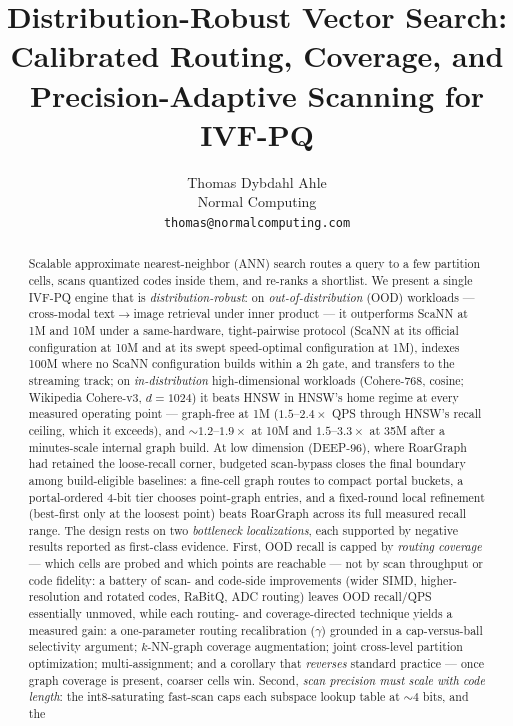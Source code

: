 \documentclass{article}
\title{Distribution-Robust Vector Search:\\
Calibrated Routing, Coverage, and Precision-Adaptive Scanning for IVF-PQ}
\author{Thomas Dybdahl Ahle\\Normal Computing\\\texttt{thomas@normalcomputing.com}}
\date{}
\begin{document}
\maketitle

\begin{abstract}
Scalable approximate nearest-neighbor (ANN) search routes a query to a few
partition cells, scans quantized codes inside them, and re-ranks a shortlist.
We present a single IVF-PQ engine that is \emph{distribution-robust}: on
\emph{out-of-distribution} (OOD) workloads --- cross-modal text$\to$image retrieval
under inner product --- it outperforms ScaNN at 1M and 10M under a same-hardware,
tight-pairwise protocol (ScaNN at its official configuration at 10M and at its
swept speed-optimal configuration at 1M), indexes 100M where no
ScaNN configuration builds within a 2h gate, and transfers to the streaming track;
on \emph{in-distribution} high-dimensional workloads (Cohere-768, cosine; Wikipedia
Cohere-v3, $d{=}1024$) it beats HNSW in HNSW's home regime at every measured operating point
--- graph-free at 1M ($1.5$--$2.4\times$ QPS through HNSW's recall ceiling, which it
exceeds), and ${\sim}1.2$--$1.9\times$ at 10M and $1.5$--$3.3\times$ at 35M after a
minutes-scale internal graph build.
At low dimension (DEEP-96), where RoarGraph had retained the loose-recall corner,
budgeted scan-bypass closes the final boundary among build-eligible baselines: a fine-cell graph routes
to compact portal buckets, a portal-ordered 4-bit tier chooses point-graph entries,
and a fixed-round local refinement (best-first only at the loosest point) beats
RoarGraph across its full measured recall range.
The design rests on two \emph{bottleneck localizations}, each supported by
negative results reported as first-class evidence. First, OOD recall is capped by
\emph{routing coverage} --- which cells are probed and which points are reachable ---
not by scan throughput or code fidelity: a battery of scan- and code-side
improvements (wider SIMD, higher-resolution and rotated codes, RaBitQ, ADC routing)
leaves OOD recall/QPS essentially unmoved, while each routing- and coverage-directed
technique yields a measured gain: a one-parameter routing recalibration ($\gamma$)
grounded in a cap-versus-ball selectivity argument; $k$-NN-graph coverage
augmentation; joint cross-level partition optimization; multi-assignment; and a
corollary that \emph{reverses} standard practice --- once graph coverage is present,
coarser cells win. Second, \emph{scan precision must scale with code length}: the
int8-saturating fast-scan caps each subspace lookup table at ${\sim}4$ bits, and the

\end{abstract}
\end{document}
